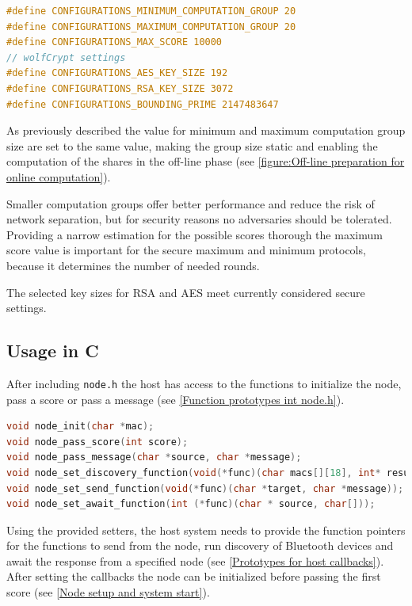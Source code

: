 \begin{lstlisting}[language=C, caption={Definitions in configurations.h}, label={Definitions in configurations.h}, float, floatplacement=H]
#define CONFIGURATIONS_MINIMUM_COMPUTATION_GROUP 20
#define CONFIGURATIONS_MAXIMUM_COMPUTATION_GROUP 20
#define CONFIGURATIONS_MAX_SCORE 10000
// wolfCrypt settings
#define CONFIGURATIONS_AES_KEY_SIZE 192
#define CONFIGURATIONS_RSA_KEY_SIZE 3072
#define CONFIGURATIONS_BOUNDING_PRIME 2147483647
\end{lstlisting}

As previously described the value for minimum and maximum computation group size are set to the same value, making the group size static and enabling the computation of the shares in the off-line phase (see \autoref{figure:Off-line preparation for online computation}). 

Smaller computation groups offer better performance and reduce the risk of network separation, but for security reasons no adversaries should be tolerated. Providing a narrow estimation for the possible scores thorough the maximum score value is important for the secure maximum and minimum protocols, because it determines the number of needed rounds.

The selected key sizes for \gls{RSA} and \gls{AES} meet currently considered secure settings.  

\subsection{Usage in C}	\label{Usage in C}

After including \lstinline|node.h| the host has access to the functions to initialize the node, pass a score or pass a message (see \autoref{Function prototypes int node.h}). 

\begin{lstlisting}[language=C, caption={Function prototypes int node.h}, label={Function prototypes int node.h}, float, floatplacement=H]
void node_init(char *mac);
void node_pass_score(int score);
void node_pass_message(char *source, char *message);
void node_set_discovery_function(void(*func)(char macs[][18], int* result_count));
void node_set_send_function(void(*func)(char *target, char *message));
void node_set_await_function(int (*func)(char * source, char[]));
\end{lstlisting}

Using the provided setters, the host system needs to provide the function pointers for the functions to send from the node, run discovery of Bluetooth devices and await the response from a specified node (see \autoref{Prototypes for host callbacks}). After setting the callbacks the node can be initialized before passing the first score (see \autoref{Node setup and system start}).

